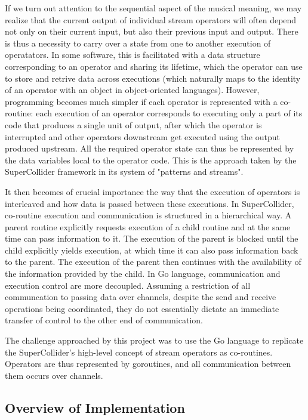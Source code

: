 \documentclass {article}
\begin{document}
If we turn out attention to the sequential aspect of the musical meaning, we may
realize that the current output of individual stream operators will often depend
not only on their current input, but also their previous input and output. There
is thus a necessity to carry over a state from one to another execution of
operatators. In some software, this is facilitated with a data structure
corresponding to an operator and sharing its lifetime, which the operator can
use to store and retrive data across executions (which naturally maps to the
identity of an operator with an object in object-oriented languages). However,
programming becomes much simpler if each operator is represented with a
co-routine: each execution of an operator corresponds to executing only a part
of its code that produces a single unit of output, after which the operator is
interrupted and other operators downstream get executed using the output
produced upstream. All the required operator state can thus be represented by
the data
variables local to the operator code. This is the approach taken by the
SuperCollider framework in its system of "patterns and streams".

It then becomes of crucial importance the way that the execution of operators is
interleaved and how data is passed between these executions. In SuperCollider,
co-routine execution and communication is structured in a hierarchical way. A
parent routine explicitly requests execution of a child routine and at the same
time can pass information to it. The execution of the parent is blocked until
the child explicitly yields execution, at which time it can also pass
information back to the parent. The execution of the parent then continues with
the availability of the information provided by the child. In Go language,
communication and execution control are more decoupled. Assuming a restriction
of all communcation to passing data over channels, despite the send and receive
operations being coordinated, they do not essentially dictate an immediate
transfer of control to the other end of communication.

The challenge approached by this project was to use the Go language to replicate
the SuperCollider's high-level concept of stream operators as co-routines.
Operators are thus represented by goroutines, and all communication between them
occurs over channels.

\subsection{Overview of Implementation}
\end{document}

